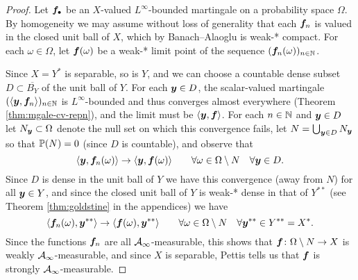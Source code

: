 \begin{proof}
  Let $\mb{f}_{\bullet}$ be an $X$-valued $L^\infty$-bounded martingale on a probability space $\Omega$.
  By homogeneity we may assume without loss of generality that each $\mb{f}_n$ is valued in the closed unit ball of $X$, which by Banach--Alaoglu is weak-* compact.
  For each $\omega \in \Omega$, let $\mb{f}(\omega)$ be a weak-* limit point of the sequence $(\mb{f}_n(\omega))_{n \in \N}$.
  
  Since $X = Y^*$ is separable, so is $Y$, and we can choose a countable dense subset $D \subset \overline{B_{Y}}$ of the unit ball of $Y$.
  For each $\mb{y} \in D$, the scalar-valued martingale $(\langle \mb{y}, \mb{f}_n \rangle)_{n \in \N}$ is $L^\infty$-bounded and thus converges almost everywhere (Theorem \ref{thm:mgale-cv-repn}), and the limit must be $\langle \mb{y}, \mb{f} \rangle$.
  For each $n \in \N$ and $\mb{y} \in D$ let $N_{\mb{y}} \subset \Omega$ denote the null set on which this convergence fails, let $N = \bigcup_{\mb{y} \in D} N_{\mb{y}}$ so that $\P(N) = 0$ (since $D$ is countable), and observe that
  \begin{equation*}
    \langle \mb{y}, \mb{f}_n(\omega) \rangle \to \langle \mb{y}, \mb{f}(\omega) \rangle \qquad \forall \omega \in \Omega \sm N \quad \forall \mb{y} \in D.
  \end{equation*}
  Since $D$ is dense in the unit ball of $Y$ we have this convergence (away from $N$) for all $\mb{y} \in Y$, and since the closed unit ball of $Y$ is weak-* dense in that of $Y^{**}$ (see Theorem \ref{thm:goldstine} in the appendices) we have
    \begin{equation*}
      \langle \mb{f}_n(\omega), \mb{y}^{**} \rangle \to \langle \mb{f}(\omega), \mb{y}^{**} \rangle \qquad \forall \omega \in \Omega \sm N \quad \forall \mb{y}^{**} \in Y^{**} = X^{*}.
  \end{equation*}
  Since the functions $\mb{f}_n$ are all $\mc{A}_{\infty}$-measurable, this shows that $\map{\mb{f}}{\Omega \sm N}{X}$ is weakly $\mc{A}_{\infty}$-measurable, and since $X$ is separable, Pettis tells us that $\mb{f}$ is strongly $\mc{A}_{\infty}$-measurable.


\end{proof}
